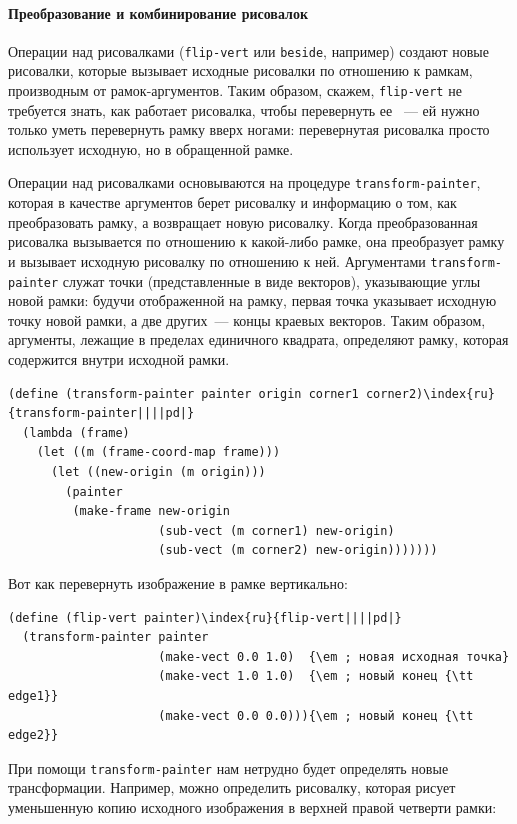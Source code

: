 \paragraph{Преобразование и комбинирование рисовалок}


Операции над рисовалками ({\tt flip-vert} или
{\tt beside}, например) создают новые рисовалки, которые
вызывает исходные рисовалки по отношению к рамкам, производным от
рамок-аргументов. Таким образом, скажем, {\tt flip-vert} не
требуется знать, как работает рисовалка, чтобы перевернуть ее ~--- ей
нужно только уметь перевернуть рамку вверх ногами: перевернутая
рисовалка просто использует исходную, но в обращенной рамке.

Операции над рисовалками основываются на процедуре
{\tt trans\-form-pain\-ter}, которая в качестве аргументов берет
рисовалку и информацию о том, как преобразовать рамку, а возвращает
новую рисовалку.  Когда преобразованная рисовалка вызывается по
отношению к какой-либо рамке, она преобразует рамку и вызывает
исходную рисовалку по отношению к ней.  Аргументами
{\tt transform-painter} служат точки (представленные в виде
векторов), указывающие углы новой рамки: будучи отображенной на рамку,
первая точка указывает исходную точку новой рамки, а две других~--- концы
краевых векторов.  Таким образом, аргументы, лежащие в пределах
единичного квадрата, определяют рамку, которая содержится внутри
исходной рамки.

\begin{Verbatim}[fontsize=\small]
(define (transform-painter painter origin corner1 corner2)\index{ru}{transform-painter||||pd|}
  (lambda (frame)
    (let ((m (frame-coord-map frame)))
      (let ((new-origin (m origin)))
        (painter
         (make-frame new-origin
                     (sub-vect (m corner1) new-origin)
                     (sub-vect (m corner2) new-origin)))))))
\end{Verbatim}

Вот как перевернуть изображение в рамке вертикально:

\begin{Verbatim}[fontsize=\small]
(define (flip-vert painter)\index{ru}{flip-vert||||pd|}
  (transform-painter painter
                     (make-vect 0.0 1.0)  {\em ; новая исходная точка}
                     (make-vect 1.0 1.0)  {\em ; новый конец {\tt edge1}}
                     (make-vect 0.0 0.0))){\em ; новый конец {\tt edge2}}
\end{Verbatim}
При помощи {\tt transform-painter} нам нетрудно будет определять
новые тран\-с\-формации.  Например, можно определить рисовалку, которая
рисует уменьшенную копию исходного изображения в верхней правой
четверти рамки:

